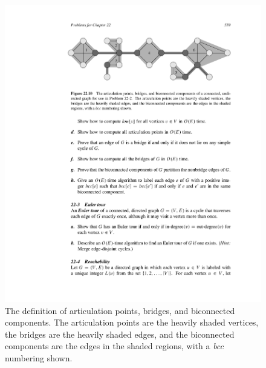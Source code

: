 \documentclass[12pt,a4paper]{article}
\theoremstyle{definition}
\begin{document}
\begin{enumerate}
	 \begin{figure}[htbp]
		\centering
		\includegraphics[width=6in]{Fig-Definition.pdf}
		\caption{The definition of articulation points, bridges, and biconnected components. The articulation points are the heavily shaded vertices, the bridges are the heavily shaded edges, and the biconnected components are the edges in the shaded regions, with a \textit{bcc} numbering shown.}
		\label{def}
	\end{figure}


\end{enumerate}
\end{document}
